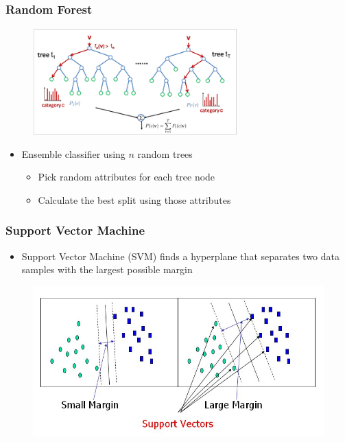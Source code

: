\documentclass{beamer}
\begin{document}
\subsection{}
\frame
{
    \frametitle{Random Forest}

    \begin{figure}
        \centering
        \includegraphics[width=0.7\textwidth]{random_forest_new2.png}
    \end{figure}

    \begin{itemize}
        \item Ensemble classifier using $n$ random trees
        \begin{itemize}
            \item Pick random attributes for each tree node
            \item Calculate the best split using those attributes
        \end{itemize}
    \end{itemize}

}

\frame
{
  \frametitle{Support Vector Machine}

  \begin{itemize}
    \item Support Vector Machine (SVM) finds a hyperplane that separates two data samples with the largest possible margin 
  \end{itemize}

\begin{figure}
	\centering
	\includegraphics[width=\textwidth]{svm_margin.jpg}
\end{figure}
}
\end{document}
